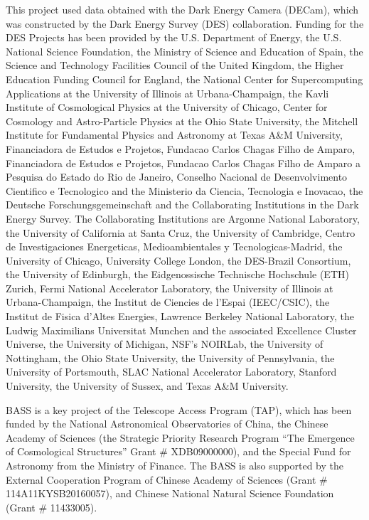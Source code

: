 \documentclass[fleqn,usenatbib]{mnras}
\begin{document}
This project used data obtained with the Dark Energy Camera (DECam), which was
constructed by the Dark Energy Survey (DES) collaboration. Funding for the DES
Projects has been provided by the U.S. Department of Energy, the U.S. National
Science Foundation, the Ministry of Science and Education of Spain, the Science
and Technology Facilities Council of the United Kingdom, the Higher Education
Funding Council for England, the National Center for Supercomputing
Applications at the University of Illinois at Urbana-Champaign, the Kavli
Institute of Cosmological Physics at the University of Chicago, Center for
Cosmology and Astro-Particle Physics at the Ohio State University, the Mitchell
Institute for Fundamental Physics and Astronomy at Texas A\&M University,
Financiadora de Estudos e Projetos, Fundacao Carlos Chagas Filho de Amparo,
Financiadora de Estudos e Projetos, Fundacao Carlos Chagas Filho de Amparo a
Pesquisa do Estado do Rio de Janeiro, Conselho Nacional de Desenvolvimento
Cientifico e Tecnologico and the Ministerio da Ciencia, Tecnologia e Inovacao,
the Deutsche Forschungsgemeinschaft and the Collaborating Institutions in the
Dark Energy Survey. The Collaborating Institutions are Argonne National
Laboratory, the University of California at Santa Cruz, the University of
Cambridge, Centro de Investigaciones Energeticas, Medioambientales y
Tecnologicas-Madrid, the University of Chicago, University College London, the
DES-Brazil Consortium, the University of Edinburgh, the Eidgenossische
Technische Hochschule (ETH) Zurich, Fermi National Accelerator Laboratory, the
University of Illinois at Urbana-Champaign, the Institut de Ciencies de l’Espai
(IEEC/CSIC), the Institut de Fisica d’Altes Energies, Lawrence Berkeley
National Laboratory, the Ludwig Maximilians Universitat Munchen and the
associated Excellence Cluster Universe, the University of Michigan, NSF’s
NOIRLab, the University of Nottingham, the Ohio State University, the
University of Pennsylvania, the University of Portsmouth, SLAC National
Accelerator Laboratory, Stanford University, the University of Sussex, and
Texas A\&M University.

BASS is a key project of the Telescope Access Program (TAP), which has been
funded by the National Astronomical Observatories of China, the Chinese Academy
of Sciences (the Strategic Priority Research Program “The Emergence of
Cosmological Structures” Grant \# XDB09000000), and the Special Fund for
Astronomy from the Ministry of Finance. The BASS is also supported by the
External Cooperation Program of Chinese Academy of Sciences (Grant \#
114A11KYSB20160057), and Chinese National Natural Science Foundation (Grant \#
11433005).
\end{document}
